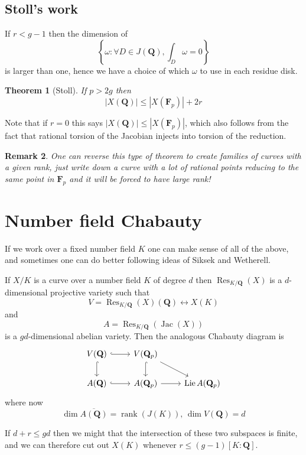 \documentclass[oneside,11pt,]{article}
\newtheorem{theorem}{Theorem}
\newtheorem{remark}[theorem]{Remark}
\DeclareMathOperator{\Jac}{Jac}
\DeclareMathOperator{\rank}{rank}
\DeclareMathOperator{\Res}{Res}
\newcommand{\QQ}{\mathbf{Q}}
\let\emph\relax %
\begin{document}
\subsection{Stoll's work}
If $r < g - 1$ then the dimension of
\[
\left\{\omega :\forall D \in J(\mathbf Q), \int_D \omega = 0 \right\}\]
is larger than one, hence we have a choice of which $\omega$ to use in each residue disk.

\begin{theorem}[Stoll]
    If $p > 2g$ then
    \[
        | X(\mathbf Q)| \le | X(\mathbf F_p)| + 2r
    \]
\end{theorem}

Note that if $r=0$ this says $| X(\mathbf Q)| \le | X(\mathbf F_p)|$, which also follows from the fact that rational torsion of the Jacobian injects into torsion of the reduction.

\begin{remark}
    One can reverse this type of theorem to create families of curves with a given rank, just write down a curve with a lot of rational points reducing to the same point in $\mathbf F_p$ and it will be forced to have large rank!
\end{remark}

\section{Number field Chabauty}
If we work over a fixed number field $K$ one can make sense of all of the above, and sometimes one can do better following ideas of Siksek and Wetherell.

If $X/K$ is a curve over a number field $K$ of degree $d$ then \(\Res_{K/\QQ} (X)\)
is a $d$-dimensional projective variety such that
\[V = \Res_{K/\QQ} (X)(\QQ) \leftrightarrow X(K)\]
and
\[A = \Res_{K/\QQ} (\Jac(X))\]
is a $gd$-dimensional abelian variety.
Then the analogous Chabauty diagram is
\[\begin{tikzcd}
	{V(\mathbf Q)} & {V(\mathbf Q_p)} \\
    {A(\mathbf Q)} & {A(\mathbf Q_p)} & {\operatorname{Lie} A (\mathbf Q_p)}
	\arrow[hook, from=1-1, to=1-2]
	\arrow[hook, from=1-1, to=2-1]
	\arrow[hook, from=1-2, to=2-2]
	\arrow[hook, from=2-1, to=2-2]
	\arrow[from=1-2, to=2-3]
	\arrow[from=2-2, to=2-3]
\end{tikzcd}\]
where now
\[\dim \overline{A(\QQ)} = \rank(J(K)),\,
\dim V(\QQ) = d\]

If \(d + r \le gd \) then we might \emph{hope} that the intersection of these two subspaces is finite, and we can therefore cut out $X(K)$ whenever
\(r \le (g - 1)[K : \QQ]\).
\end{document}
